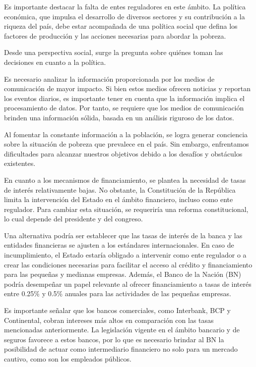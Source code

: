 \documentclass[
  a4paper,
]{article}
\begin{document}
Es importante destacar la falta de entes reguladores en este ámbito. La
política económica, que impulsa el desarrollo de diversos sectores y su
contribución a la riqueza del país, debe estar acompañada de una
política social que defina los factores de producción y las acciones
necesarias para abordar la pobreza.

Desde una perspectiva social, surge la pregunta sobre quiénes toman las
decisiones en cuanto a la política.

Es necesario analizar la información proporcionada por los medios de
comunicación de mayor impacto. Si bien estos medios ofrecen noticias y
reportan los eventos diarios, es importante tener en cuenta que la
información implica el procesamiento de datos. Por tanto, se requiere
que los medios de comunicación brinden una información sólida, basada en
un análisis riguroso de los datos.

Al fomentar la constante información a la población, se logra generar
conciencia sobre la situación de pobreza que prevalece en el país. Sin
embargo, enfrentamos dificultades para alcanzar nuestros objetivos
debido a los desafíos y obstáculos existentes.

En cuanto a los mecanismos de financiamiento, se plantea la necesidad de
tasas de interés relativamente bajas. No obstante, la Constitución de la
República limita la intervención del Estado en el ámbito financiero,
incluso como ente regulador. Para cambiar esta situación, se requeriría
una reforma constitucional, lo cual depende del presidente y del
congreso.

Una alternativa podría ser establecer que las tasas de interés de la
banca y las entidades financieras se ajusten a los estándares
internacionales. En caso de incumplimiento, el Estado estaría obligado a
intervenir como ente regulador o a crear las condiciones necesarias para
facilitar el acceso al crédito y financiamiento para las pequeñas y
medianas empresas. Además, el Banco de la Nación (BN) podría desempeñar
un papel relevante al ofrecer financiamiento a tasas de interés entre
0.25\% y 0.5\% anuales para las actividades de las pequeñas empresas.

Es importante señalar que los bancos comerciales, como Interbank, BCP y
Continental, cobran intereses más altos en comparación con las tasas
mencionadas anteriormente. La legislación vigente en el ámbito bancario
y de seguros favorece a estos bancos, por lo que es necesario brindar al
BN la posibilidad de actuar como intermediario financiero no solo para
un mercado cautivo, como son los empleados públicos.
\end{document}
